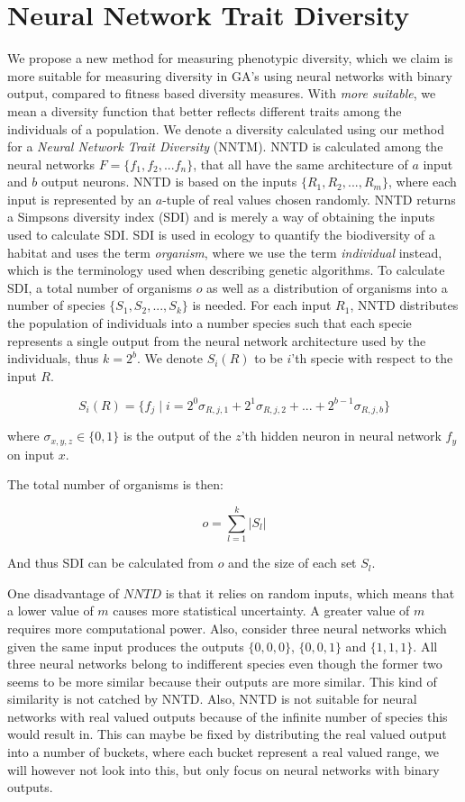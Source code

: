 \section{Neural Network Trait Diversity}
We propose a new method for measuring phenotypic diversity, which we claim is more suitable for measuring diversity in GA's using neural networks with binary output, compared to fitness based diversity measures. With \emph{more suitable}, we mean a diversity function that better reflects different traits among the individuals of a population. 
We denote a diversity calculated using our method for a \emph{Neural Network Trait Diversity} (NNTM).
NNTD is calculated among the neural networks $F = \{f_1, f_2, ... f_n\}$, that all have the same architecture of $a$ input and $b$ output neurons. NNTD is based on the inputs $\{R_1, R_2, ..., R_m\}$, where each input is represented by an $a$-tuple of real values chosen randomly. NNTD returns a Simpsons diversity index (SDI) and is merely a way of obtaining the inputs used to calculate SDI. SDI is used in ecology to quantify the biodiversity of a habitat and uses the term \emph{organism}, where we use the term \emph{individual} instead, which is the terminology used when describing genetic algorithms. To calculate SDI, a total number of organisms $o$ as well as a distribution of organisms into a number of species $\{S_1, S_2, ..., S_k\}$ is needed.
For each input $R_1$, NNTD distributes the population of individuals into a number species such that each specie represents a single output from the neural network architecture used by the individuals, thus $k = 2^b$. We denote $S_i(R)$ to be $i$'th specie with respect to the input $R$.

\[S_i(R) = \{f_j \; | \; i = 2^0\sigma_{R,j,1} + 2^1\sigma_{R,j,2} + ... + 2^{b-1}\sigma_{R,j,b} \}\]

where $\sigma_{x,y,z} \in \{0, 1\}$ is the output of the $z$'th hidden neuron in neural network $f_y$ on input $x$.

The total number of organisms is then:

\[o = \sum\limits_{l = 1}^k |S_l|\]

And thus SDI can be calculated from $o$ and the size of each set $S_l$.

One disadvantage of $NNTD$ is that it relies on random inputs, which means that a lower value of $m$ causes more statistical uncertainty. A greater value of $m$ requires more computational power. Also, consider three neural networks which given the same input produces the outputs $\{0, 0, 0\}$, $\{0, 0, 1\}$ and $\{1, 1, 1\}$. All three neural networks belong to indifferent species even though the former two seems to be more similar because their outputs are more similar. This kind of similarity is not catched by NNTD. Also, NNTD is not suitable for neural networks with real valued outputs because of the infinite number of species this would result in. This can maybe be fixed by distributing the real valued output into a number of buckets, where each bucket represent a real valued range, we will however not look into this, but only focus on neural networks with binary outputs.
